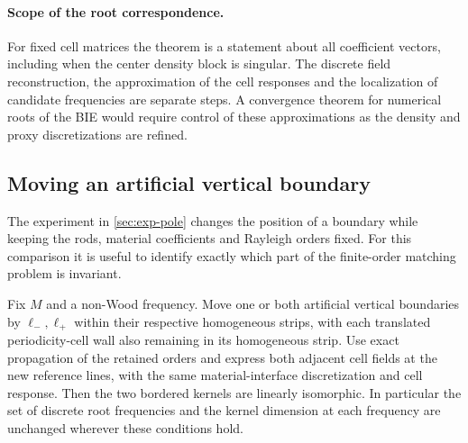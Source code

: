 \paragraph{Scope of the root correspondence.}
For fixed cell matrices the theorem is a statement about all coefficient
vectors, including when the center density block is singular. The discrete
field reconstruction, the approximation of the cell responses and the
localization of candidate frequencies are separate steps. A convergence
theorem for numerical roots of the BIE would require control of these
approximations as the density and proxy discretizations are refined.


\subsection{Moving an artificial vertical boundary}\label{sec:boundary-shift}
The experiment in \cref{sec:exp-pole} changes the position of a boundary
while keeping the rods, material coefficients and Rayleigh orders fixed.
For this comparison it is useful to identify exactly which part of the
finite-order matching problem is invariant.

\begin{lemma}\label{lem:shift}
Fix $M$ and a non-Wood frequency. Move one or both artificial vertical
boundaries by $\ell_-,\ell_+$ within their respective homogeneous strips, with each translated
periodicity-cell wall also remaining in its homogeneous strip.
Use exact propagation of the retained orders and express both adjacent
cell fields at the new reference lines, with the same material-interface
discretization and cell response. Then the two bordered kernels are
linearly isomorphic. In particular the set of discrete root frequencies
and the kernel dimension at each frequency are unchanged wherever these
conditions hold.
\end{lemma}

